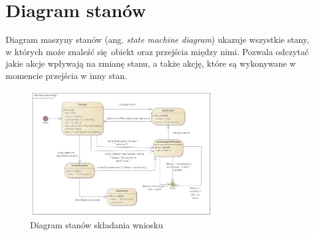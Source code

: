 \section{Diagram stanów}
Diagram maszyny stanów (ang. \textit{state machine diagram}) ukazuje wszystkie stany, w których może znaleźć się obiekt oraz przejścia między nimi. Pozwala odczytać jakie akcje wpływają na zmianę stanu, a także akcję, które są wykonywane w momencie przejścia w inny stan.
\begin{figure}[H]
	\centering
	\includegraphics[width=0.7\textwidth]{images/Wniosek.jpg}
	\caption{Diagram stanów składania wniosku}
	\label{fig:StateMachine}
\end{figure}

